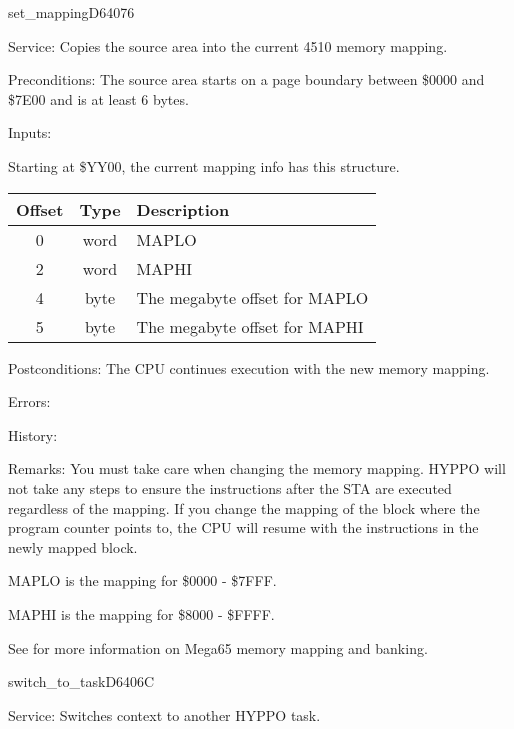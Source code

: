 \newpage
\begin{hyppotrap}{set\_mapping}{D640}{76}
\item [Service:]
  Copies the source area into the current 4510 memory mapping.
\item [Preconditions:]
  The source area starts on a page boundary between \$0000 and \$7E00 and
  is at least 6 bytes.
\item [Inputs:]

  Starting at \$YY00, the current mapping info has this structure.
  {\setlength{\tabcolsep}{2mm}
  \begin{tabular}{|c|c|p{6.9cm}|}
  \hline
  \textbf{Offset} & \textbf{Type} & \textbf{Description} \\
  \hline
  0 & word & MAPLO \\
  2 & word & MAPHI \\
  4 & byte & The megabyte offset for MAPLO \\
  5 & byte & The megabyte offset for MAPHI \\
  \hline
  \end{tabular}
  }
\item [Postconditions:]
  The CPU continues execution with the new memory mapping.
\item [Errors:]
\item [History:]
\item [Remarks:]
  You must take care when changing the memory mapping. HYPPO will not take any
  steps to ensure the instructions after the STA are executed regardless of the
  mapping. If you change the mapping of the block where the program counter
  points to, the CPU will resume with the instructions in the newly mapped
  block.

  MAPLO is the mapping for \$0000 - \$7FFF.

  MAPHI is the mapping for \$8000 - \$FFFF.

  See \TODO{} for more information on Mega65 memory mapping and banking.
\end{hyppotrap}


\newpage
\begin{hyppotrap}{switch\_to\_task}{D640}{6C}
\item [Service:]
  Switches context to another HYPPO task.
\notimplemented
\end{hyppotrap}


